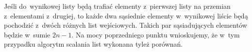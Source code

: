 \subproblem %
Jeśli do~wynikowej listy będą trafiać elementy z~pierwszej listy na przemian z~elementami z~drugiej, to każde dwa sąsiednie elementy w~wynikowej liście będą pochodzić z~dwóch różnych list wejściowych. Takich par sąsiadujących elementów będzie w~sumie $2n-1$. Na mocy poprzedniego punktu wnioskujemy, że w~tym przypadku algorytm scalania list wykonana tyleż porównań.

\endinput
